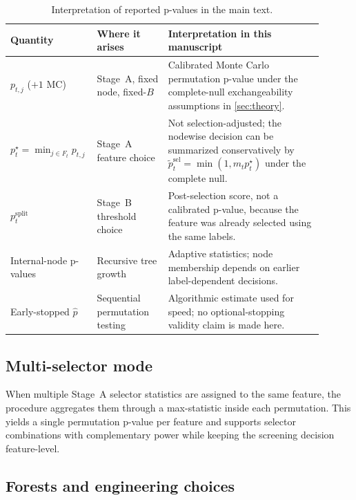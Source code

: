 \begin{table}[t]
  \centering
  \small
  \setlength{\tabcolsep}{4pt}
  \begin{tabular}{@{}p{0.20\linewidth}p{0.22\linewidth}p{0.48\linewidth}@{}}
    \toprule
    Quantity & Where it arises & Interpretation in this manuscript \\
    \midrule
    $p_{t,j}$ ($+1$ MC) &
    Stage~A, fixed node, fixed-$B$ &
    Calibrated Monte Carlo permutation p-value under the complete-null
    exchangeability assumptions in \cref{sec:theory}. \\
    $p_t^\star = \min_{j\in F_t} p_{t,j}$ &
    Stage~A feature choice &
    Not selection-adjusted; the nodewise decision can be summarized
    conservatively by $\tilde p_t^{\mathrm{sel}}=\min(1,m_t p_t^\star)$ under
    the complete null. \\
    $p_t^{\mathrm{split}}$ &
    Stage~B threshold choice &
    Post-selection score, not a calibrated p-value, because the feature was
    already selected using the same labels. \\
    Internal-node p-values &
    Recursive tree growth &
    Adaptive statistics; node membership depends on earlier label-dependent
    decisions. \\
    Early-stopped $\widehat p$ &
    Sequential permutation testing &
    Algorithmic estimate used for speed; no optional-stopping validity claim is
    made here. \\
    \bottomrule
  \end{tabular}
  \caption{Interpretation of reported p-values in the main text.}
  \label{tab:pvalue-scope}
\end{table}

\subsection{Multi-selector mode}
\label{sec:multiselector}

When multiple Stage~A selector statistics are assigned to the same feature,
the procedure aggregates them through a max-statistic inside each permutation.
This yields a single permutation p-value per feature and supports selector
combinations with complementary power while keeping the screening decision
feature-level.

\subsection{Forests and engineering choices}
\label{sec:bootstrap}

